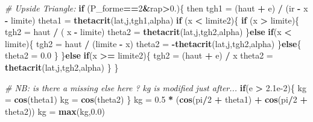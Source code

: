\documentclass[]{book}
\newenvironment{Shaded}{\begin{snugshade}}{\end{snugshade}}
\newcommand{\KeywordTok}[1]{\textcolor[rgb]{0.13,0.29,0.53}{\textbf{#1}}}
\newcommand{\DecValTok}[1]{\textcolor[rgb]{0.00,0.00,0.81}{#1}}
\newcommand{\FloatTok}[1]{\textcolor[rgb]{0.00,0.00,0.81}{#1}}
\newcommand{\StringTok}[1]{\textcolor[rgb]{0.31,0.60,0.02}{#1}}
\newcommand{\CommentTok}[1]{\textcolor[rgb]{0.56,0.35,0.01}{\textit{#1}}}
\newcommand{\ControlFlowTok}[1]{\textcolor[rgb]{0.13,0.29,0.53}{\textbf{#1}}}
\newcommand{\OperatorTok}[1]{\textcolor[rgb]{0.81,0.36,0.00}{\textbf{#1}}}
\newcommand{\NormalTok}[1]{#1}
\theoremstyle{definition}
\theoremstyle{definition}
\theoremstyle{definition}
\theoremstyle{remark}
\begin{document}
\begin{Shaded}
\begin{Highlighting}[]
  \CommentTok{# Upside Triangle:}
  \ControlFlowTok{if}\NormalTok{ (P_forme}\OperatorTok{==}\DecValTok{2}\OperatorTok{&}\NormalTok{rap}\OperatorTok{>}\DecValTok{0}\NormalTok{.)\{ then}
\NormalTok{    tgh1 =}\StringTok{ }\NormalTok{(haut }\OperatorTok{+}\StringTok{ }\NormalTok{e) }\OperatorTok{/}\StringTok{ }\NormalTok{(ir }\OperatorTok{-}\StringTok{ }\NormalTok{x }\OperatorTok{-}\StringTok{ }\NormalTok{limite)}
\NormalTok{    theta1 =}\StringTok{ }\KeywordTok{thetacrit}\NormalTok{(lat,j,tgh1,alpha)}
    \ControlFlowTok{if}\NormalTok{ (x }\OperatorTok{<}\StringTok{ }\NormalTok{limite2)\{}
      \ControlFlowTok{if}\NormalTok{ (x }\OperatorTok{>}\StringTok{ }\NormalTok{limite)\{}
\NormalTok{        tgh2 =}\StringTok{ }\NormalTok{haut }\OperatorTok{/}\StringTok{ }\NormalTok{( x }\OperatorTok{-}\StringTok{ }\NormalTok{limite)}
\NormalTok{        theta2 =}\StringTok{ }\KeywordTok{thetacrit}\NormalTok{(lat,j,tgh2,alpha)}
\NormalTok{      \}}\ControlFlowTok{else} \ControlFlowTok{if}\NormalTok{(x }\OperatorTok{<}\StringTok{ }\NormalTok{limite)\{}
\NormalTok{        tgh2 =}\StringTok{ }\NormalTok{haut }\OperatorTok{/}\StringTok{ }\NormalTok{(limite }\OperatorTok{-}\StringTok{ }\NormalTok{x)}
\NormalTok{        theta2 =}\StringTok{ }\OperatorTok{-}\KeywordTok{thetacrit}\NormalTok{(lat,j,tgh2,alpha)}
\NormalTok{      \}}\ControlFlowTok{else}\NormalTok{\{}
\NormalTok{        theta2 =}\StringTok{ }\FloatTok{0.0}
\NormalTok{      \}}
\NormalTok{    \}}\ControlFlowTok{else} \ControlFlowTok{if}\NormalTok{(x }\OperatorTok{>=}\StringTok{ }\NormalTok{limite2)\{}
\NormalTok{      tgh2 =}\StringTok{ }\NormalTok{(haut }\OperatorTok{+}\StringTok{ }\NormalTok{e) }\OperatorTok{/}\StringTok{ }\NormalTok{x}
\NormalTok{      theta2 =}\StringTok{ }\KeywordTok{thetacrit}\NormalTok{(lat,j,tgh2,alpha)}
\NormalTok{    \}}
\NormalTok{  \}}
  
  \CommentTok{# NB: is there a missing else here ? kg is modified just after...}
  \ControlFlowTok{if}\NormalTok{(e }\OperatorTok{>}\StringTok{ }\FloatTok{2.1e-2}\NormalTok{)\{}
\NormalTok{    kg =}\StringTok{ }\KeywordTok{cos}\NormalTok{(theta1)}
\NormalTok{    kg =}\StringTok{ }\KeywordTok{cos}\NormalTok{(theta2)}
\NormalTok{  \}}
\NormalTok{  kg =}\StringTok{ }\FloatTok{0.5} \OperatorTok{*}\StringTok{ }\NormalTok{(}\KeywordTok{cos}\NormalTok{(pi}\OperatorTok{/}\DecValTok{2} \OperatorTok{+}\StringTok{ }\NormalTok{theta1) }\OperatorTok{+}\StringTok{ }\KeywordTok{cos}\NormalTok{(pi}\OperatorTok{/}\DecValTok{2} \OperatorTok{+}\StringTok{ }\NormalTok{theta2))}
\NormalTok{  kg =}\StringTok{ }\KeywordTok{max}\NormalTok{(kg,}\FloatTok{0.0}\NormalTok{)}
  

\end{Highlighting}
\end{Shaded}
\end{document}
